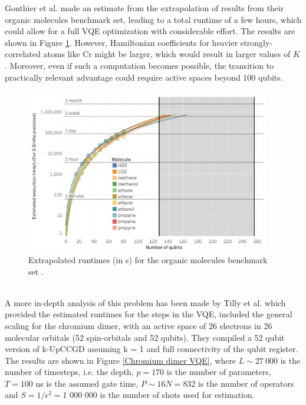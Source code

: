 Gonthier et al. \cite{Gonthier2020Dec} made an estimate from the extrapolation of results from their organic molecules benchmark set, leading to a total runtime of a few hours, which could allow for a full VQE optimization with considerable effort. The results are shown in Figure \ref{Extrapolated runtimes organic molecules}. However, Hamiltonian coefficients for heavier strongly-correlated atoms like Cr might be larger, which would result in larger values of $K$. Moreover, even if such a computation becomes possible, the transition to practically relevant advantage could require active spaces beyond 100 qubits. \\
\begin{figure}[ht]
  \centering
  \includegraphics[width=0.95\textwidth]{figures/Extrapolated runtimes organic molecules.png}
  \caption{Extrapolated runtimes (in s) for the organic molecules benchmark set \cite{Gonthier2020Dec}.} \label{Extrapolated runtimes organic molecules}
\end{figure} \\
A more in-depth analysis of this problem has been made by Tilly et al. \cite{Tilly2021Nov} which provided the estimated runtimes for the steps in the VQE, included the general scaling for the chromium dimer, with an active space of 26 electrons in 26 molecular orbitals (52 spin-orbitals and 52 qubits). They compiled a 52 qubit version of k-UpCCGD assuming k = 1 and full connectivity of the qubit register. The results are shown in Figure \ref{Chromium dimer VQE}, where $L \sim 27 \ 000$ is the number of timesteps, i.e. the depth, $p = 170$ is the number of parameters, $T = 100$ ns is the assumed gate time, $P \sim 16N = 832$ is the number of operators and $S = 1/\epsilon^2 = $1 000 000 is the number of shots used for estimation. \\
